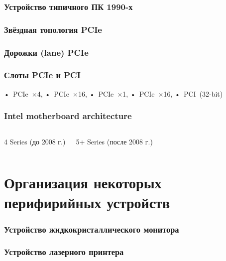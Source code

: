 \begin{frame}
\frametitle{Устройство типичного ПК 1990-х}
\end{frame}

\begin{frame}
\frametitle{Звёздная топология PCIe}
\end{frame}

\begin{frame}
\frametitle{Дорожки (lane) PCIe}
\end{frame}

\begin{frame}
\frametitle{Слоты PCIe и PCI}

•~PCIe~×4, \hfill •~PCIe~×16, \hfill •~PCIe~×1, \hfill •~PCIe~×16, \hfill •~PCI~(32-bit)
\end{frame}

\begin{frame}
\frametitle{Intel motherboard architecture}
\begin{columns}
    \column{6.3cm} 4 Series  (до 2008 г.) \\

    \pause \column{6.3cm} 5+ Series  (после 2008 г.) \\
\end{columns}
\end{frame}



\section{Организация некоторых перифирийных устройств}

\begin{frame}
\frametitle{Устройство жидкокристаллического монитора}
\end{frame}

\begin{frame}
\frametitle{Устройство лазерного принтера}
\end{frame}
